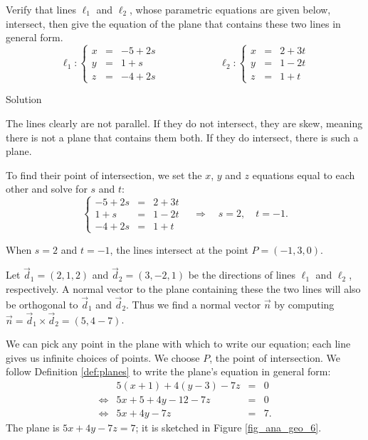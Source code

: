 \begin{example}\label{ex_planes2}
Verify that lines $\ell_1$ and $\ell_2$, whose parametric equations are given below, intersect, then give the equation of the  plane that contains these two lines in general form.
$$ \ell_1: \left\{\begin{array}{lcl} x&=&-5+2s \\ y&=&1+s \\ z&=&-4+2s\end{array}\right. \qquad\qquad\qquad
				\ell_2: \left\{\begin{array}{lcl} x &=& 2+3t\\ y&=&1-2t \\ z&=&1+t\end{array}\right.$$

Solution 


The lines clearly are not parallel. If they do not intersect, they are skew, meaning there is not a plane that contains them both. If they do intersect, there is such a plane. 

To find their point of intersection, we set the $x$, $y$ and $z$ equations equal to each other and solve for $s$ and $t$:
$$\left\{\begin{array}{lcl}
-5+2s &=&2+3t \\ 1+s &=& 1-2t \\ -4+2s &=& 1+t \end{array}\right.\quad  \Rightarrow  \quad s=2,\quad t=-1.$$

When $s=2$ and $t=-1$, the lines intersect at the point $P= (-1,3,0)$. 

Let $\vec d_1 = ( 2,1,2)$ and $\vec d_2=( 3,-2,1)$ be the directions of lines $\ell_1$ and $\ell_2$, respectively. A normal vector to the plane containing these the two lines will also be orthogonal to $\vec d_1$ and $\vec d_2$. Thus we find a normal vector $\vec n$ by computing $\vec n = \vec d_1 \times \vec d_2= ( 5,4-7)$.

We can pick any point in the plane with which to write our equation; each line gives us infinite choices of points. We choose $P$, the point of intersection. We follow Definition \ref{def:planes} to write the plane's equation in general form:
$$
\begin{array}{rrcl}
&5(x+1) +4(y-3) -7z &=&0 \\
\Leftrightarrow&5x + 5 + 4y-12 -7z &=&0\\
\Leftrightarrow&5x+4y-7z &=&7.
\end{array}
$$
The plane is $5x+4y-7z=7$; it is sketched in Figure \ref{fig_ana_geo_6}.


\end{example}
